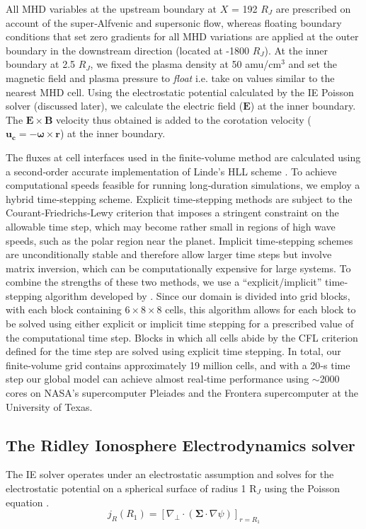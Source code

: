 All MHD variables at the upstream boundary at $X$ = 192 $R_J$ are prescribed on account of the super‐Alfvenic and supersonic flow, whereas floating boundary conditions that set zero gradients for all MHD variations are applied at the outer boundary in the downstream direction (located at -1800 $R_J$). At the inner boundary at 2.5 $R_J$, we fixed the plasma density at 50 amu/cm$^3$ and set the magnetic field and plasma pressure to \emph{float} i.e. take on values similar to the nearest MHD cell. Using the electrostatic potential calculated by the IE Poisson solver (discussed later), we calculate the electric field ($\mathbf{E}$) at the inner boundary. The $\mathbf{E} \times \mathbf{B}$ velocity thus obtained is added to the corotation velocity ($\mathbf{u_c} = -\mathbf{\omega} \times \mathbf{r}$) at the inner boundary.

The fluxes at cell interfaces used in the finite‐volume method are calculated using a second‐order accurate implementation of Linde's HLL scheme \cite{Linde2002}. To achieve computational speeds feasible for running long‐duration simulations, we employ a hybrid time‐stepping scheme. Explicit time‐stepping methods are subject to the Courant‐Friedrichs‐Lewy criterion that imposes a stringent constraint on the allowable time step, which may become rather small in regions of high wave speeds, such as the polar region near the planet. Implicit time‐stepping schemes are unconditionally stable and therefore allow larger time steps but involve matrix inversion, which can be computationally expensive for large systems. To combine the strengths of these two methods, we use a “explicit/implicit” time‐stepping algorithm developed by \cite{Toth2006AGrids}. Since our domain is divided into grid blocks, with each block containing $6 \times 8 \times 8$ cells, this algorithm allows for each block to be solved using either explicit or implicit time stepping for a prescribed value of the computational time step. Blocks in which all cells abide by the CFL criterion defined for the time step are solved using explicit time stepping. In total, our finite‐volume grid contains approximately 19 million cells, and with a 20‐s time step our global model can achieve almost real‐time performance using $\sim$2000 cores on NASA's supercomputer Pleiades and the Frontera supercomputer at the University of Texas.

\subsection{The Ridley Ionosphere Electrodynamics solver}
The IE solver operates under an electrostatic assumption and solves for the electrostatic potential on a spherical surface of radius 1 R$_J$ using the Poisson equation \cite{Ridley2004IonosphericConductance}.
\begin{equation}
    j_R \left(R_1\right) = \left[ \nabla_\perp \cdot \left( \mathbf{\Sigma} \cdot \nabla \psi \right) \right]_{r=R_1}
\end{equation}

